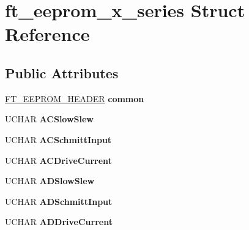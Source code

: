 \hypertarget{structft__eeprom__x__series}{}\section{ft\+\_\+eeprom\+\_\+x\+\_\+series Struct Reference}
\label{structft__eeprom__x__series}
\subsection*{Public Attributes}
\begin{DoxyCompactItemize}
\item 
\mbox{\label{structft__eeprom__x__series_a4d1ac63e7dc2e8e677edcc43b566dc01}} 
\hyperlink{structft__eeprom__header}{F\+T\+\_\+\+E\+E\+P\+R\+O\+M\+\_\+\+H\+E\+A\+D\+ER} {\bfseries common}
\item 
\mbox{\label{structft__eeprom__x__series_aa08fe7573f5f822e12a34973055c52e3}} 
U\+C\+H\+AR {\bfseries A\+C\+Slow\+Slew}
\item 
\mbox{\label{structft__eeprom__x__series_af0941a8b6cbcfb69a84c9e9bd9751e4e}} 
U\+C\+H\+AR {\bfseries A\+C\+Schmitt\+Input}
\item 
\mbox{\label{structft__eeprom__x__series_a62017256a98fdfbd1ec5a662725f9c84}} 
U\+C\+H\+AR {\bfseries A\+C\+Drive\+Current}
\item 
\mbox{\label{structft__eeprom__x__series_a3a1988ab68373c2fdc375cb4c038666f}} 
U\+C\+H\+AR {\bfseries A\+D\+Slow\+Slew}
\item 
\mbox{\label{structft__eeprom__x__series_addfb6cbf3c524edfbde9dbaf37f1f5e0}} 
U\+C\+H\+AR {\bfseries A\+D\+Schmitt\+Input}
\item 
\mbox{\label{structft__eeprom__x__series_a22a0cc77e2bf346e29d171194a91bc95}} 
U\+C\+H\+AR {\bfseries A\+D\+Drive\+Current}
\item 
\mbox{\label{structft__eeprom__x__series_a8204c3cd3a8d8ea0f1461217fdc7ce83}} 

\end{DoxyCompactItemize}
